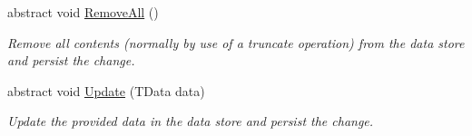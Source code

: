 \begin{DoxyCompactItemize}
abstract void \hyperlink{classCqrs_1_1Azure_1_1BlobStorage_1_1StorageStore_a4e848f342be903293812b3b660464d1a_a4e848f342be903293812b3b660464d1a}{Remove\+All} ()
\begin{DoxyCompactList}\small\item\em Remove all contents (normally by use of a truncate operation) from the data store and persist the change. \end{DoxyCompactList}\item 
abstract void \hyperlink{classCqrs_1_1Azure_1_1BlobStorage_1_1StorageStore_ae9ca8bfe30040f77e349a4d47b31da70_ae9ca8bfe30040f77e349a4d47b31da70}{Update} (T\+Data data)
\begin{DoxyCompactList}\small\item\em Update the provided {\itshape data}  in the data store and persist the change. \end{DoxyCompactList}\end{DoxyCompactItemize}
